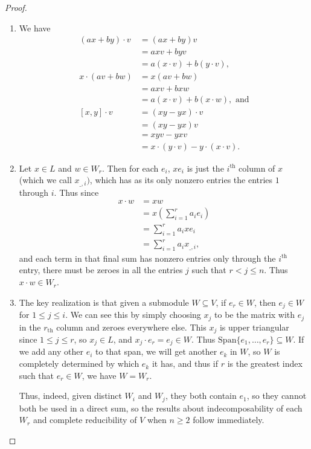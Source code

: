 \documentclass[12pt]{article}
\theoremstyle{definition}
\begin{document}
\begin{proof}\
	\begin{enumerate}[label=(\roman*)]
		\item We have \begin{align*}
		    (ax + by) \cdot v & = (ax + by)v \\
                              & = axv + byv \\
                              & = a(x \cdot v) + b(y \cdot v), \\
            x \cdot (av + bw) & = x(av + bw) \\
                              & = axv + bxw \\
                              & = a(x \cdot v) + b(x \cdot w), \text{ and} \\
               [x, y] \cdot v & = (xy - yx) \cdot v \\
                              & = (xy - yx) v \\
                              & = xyv - yxv \\
                              & = x\cdot(y\cdot v) - y\cdot(x\cdot v).
        \end{align*}
		\item Let $x \in L$ and $w \in W_r$.
        Then for each $e_i$, $xe_i$ is just the $i^{\text{th}}$ column of $x$ (which we call $x_{\_,i})$, which has as its only nonzero entries the entries $1$ through $i$.
        Thus since
        \begin{align*}
            x \cdot w & = x w \\
                      & = x \left(\sum_{i=1}^r a_ie_i\right) \\
                      & = \sum_{i=1}^r a_ixe_i \\
                      & = \sum_{i=1}^r a_ix_{\_,i},
        \end{align*}
        and each term in that final sum has nonzero entries only through the $i^\text{th}$ entry, there must be zeroes in all the entries $j$ such that $r < j \leq n$.
        Thus $x \cdot w \in W_r$.
		\item The key realization is that given a submodule $W \subseteq V$, if $e_r \in W$, then $e_j \in W$ for $1 \leq j \leq i$.
        We can see this by simply choosing $x_j$ to be the matrix with $e_j$ in the $r_\text{th}$ column and zeroes everywhere else.
        This $x_j$ is upper triangular since $1 \leq j \leq r$, so $x_j \in L$, and $x_j \cdot e_r = e_j \in W$.
        Thus $\mathrm{Span}\lbrace e_1, \dots, e_r \rbrace \subseteq W$.
        If we add any other $e_i$ to that span, we will get another $e_{k}$ in $W$, so $W$ is completely determined by which $e_k$ it has, and thus if $r$ is the greatest index such that $e_r \in W$, we have $W = W_r$.

        Thus, indeed, given distinct $W_i$ and $W_j$, they both contain $e_1$, so they cannot both be used in a direct sum, so the results about indecomposability of each $W_r$ and complete reducibility of $V$ when $n \geq 2$ follow immediately.
	\end{enumerate}
\end{proof}
\end{document}
